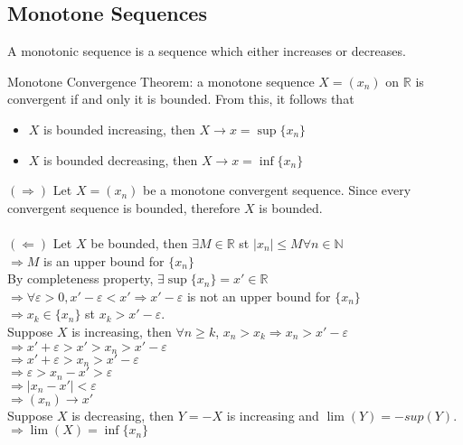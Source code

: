 \documentclass{article}
\begin{document}
\subsection{Monotone Sequences}

A monotonic sequence is a sequence which either increases or decreases.

Monotone Convergence Theorem: a monotone sequence $X = (x_n)$ on $\mathbb{R}$ is convergent if and only it is bounded. From this, it follows that
\begin{itemize}
	\item $X$ is bounded increasing, then $X \rightarrow x = \sup\{x_n\}$
	\item $X$ is bounded decreasing, then $X \rightarrow x = \inf\{x_n\}$
\end{itemize}
\begin{tcolorbox}[colback=lightgray!10,colframe=lightgray!10, fontupper=\linespread{1.5}\selectfont]
	$(\Rightarrow)$ Let $X = (x_n)$ be a monotone convergent sequence. Since every convergent sequence is bounded, therefore $X$ is bounded. \\\\	
	$(\Leftarrow)$ Let $X$ be bounded, then $\exists M \in \mathbb{R}$ st $|x_n| \leq M \forall n \in \mathbb{N}$ \\
	$\Rightarrow M$ is an upper bound for $\{x_n\}$ \\
	By completeness property, $\exists \sup\{x_n\} = x' \in \mathbb{R}$ \\
	$\Rightarrow \forall \varepsilon > 0, x' - \varepsilon < x' \Rightarrow x' - \varepsilon$ is not an upper bound for $\{x_n\}$ \\
	$\Rightarrow x_k \in \{x_n\}$ st $x_k > x' - \varepsilon$. \\
	Suppose $X$ is increasing, then $\forall n \geq k$, $x_n > x_k \Rightarrow  x_n > x' - \varepsilon$ \\
	$\Rightarrow x' + \varepsilon > x' > x_n > x' - \varepsilon$ \\
	$\Rightarrow x' + \varepsilon >  x_n > x' - \varepsilon$ \\
	$\Rightarrow \varepsilon > x_n - x' > \varepsilon$ \\
	$\Rightarrow |x_n-x'| < \varepsilon$ \\
	$\Rightarrow (x_n) \rightarrow x'$ \\
	Suppose $X$ is decreasing, then $Y=-X$ is increasing and $\lim(Y) = -sup(Y)$. \\
	$\Rightarrow \lim(X) = \inf\{x_n\}$
\end{tcolorbox}
\end{document}
